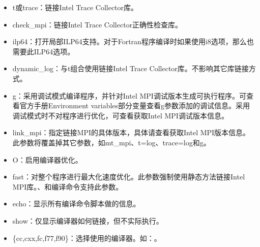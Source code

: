 \documentclass[a4paper,12pt,english]{sphinxmanual}
\begin{document}
\begin{itemize}
\item {} 
\sphinxAtStartPar
\sphinxhyphen{}t或\sphinxhyphen{}trace：链接Intel Trace Collector库。

\item {} 
\sphinxAtStartPar
\sphinxhyphen{}check\_mpi：链接Intel Trace Collector正确性检查库。

\item {} 
\sphinxAtStartPar
\sphinxhyphen{}ilp64：打开局部ILP64支持。对于Fortran程序编译时如果使用\sphinxhyphen{}i8选项，那么也需要此ILP64选项。

\item {} 
\sphinxAtStartPar
\sphinxhyphen{}dynamic\_log：与\sphinxhyphen{}t组合使用链接Intel Trace Collector库。不影响其它库链接方式。

\item {} 
\sphinxAtStartPar
\sphinxhyphen{}g：采用调试模式编译程序，并针对Intel MPI调试版本生成可执行程序。可查看官方手册Environment variables部分变量查看\sphinxhyphen{}g参数添加的调试信息。采用调试模式时不对程序进行优化，可查看获取Intel MPI调试版本信息。

\item {} 
\sphinxAtStartPar
\sphinxhyphen{}link\_mpi：指定链接MPI的具体版本，具体请查看获取Intel MPI版本信息。此参数将覆盖掉其它参数，如\sphinxhyphen{}mt\_mpi、\sphinxhyphen{}t=log、\sphinxhyphen{}trace=log和\sphinxhyphen{}g。

\item {} 
\sphinxAtStartPar
\sphinxhyphen{}O：启用编译器优化。

\item {} 
\sphinxAtStartPar
\sphinxhyphen{}fast：对整个程序进行最大化速度优化。此参数强制使用静态方法链接Intel MPI库。、和编译命令支持此参数。

\item {} 
\sphinxAtStartPar
\sphinxhyphen{}echo：显示所有编译命令脚本做的信息。

\item {} 
\sphinxAtStartPar
\sphinxhyphen{}show：仅显示编译器如何链接，但不实际执行。

\item {} 
\sphinxAtStartPar
\sphinxhyphen{}\{cc,cxx,fc,f77,f90\}：选择使用的编译器。如：。


\end{itemize}
\end{document}
